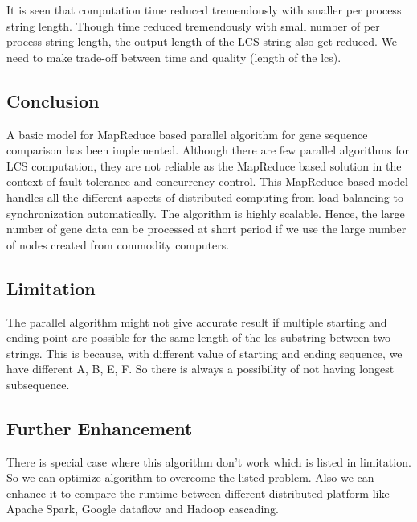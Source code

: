 \documentclass[journal,twoside]{IEEEtran}
\begin{document}
It is seen that computation time reduced tremendously with smaller per process string length. Though time reduced tremendously with small number of per process string length, the output length of the LCS string also get reduced. We need to make trade-off between time and quality (length of the lcs). 


\subsection{Conclusion}
A basic model for MapReduce based parallel algorithm for gene sequence comparison has been implemented. Although there are few parallel algorithms for LCS computation, they are not reliable as the MapReduce based solution in the context of fault tolerance and concurrency control. This MapReduce based model handles all the different aspects of distributed computing from load balancing to synchronization automatically. The algorithm is highly scalable. Hence, the large number of gene data can be processed at short period if we use the large number of nodes created from commodity computers.

\subsection{Limitation}
The parallel algorithm might not give accurate result if multiple starting and ending point are possible for the same length of the lcs substring between two strings. This is because, with different value of starting and ending sequence, we have different A, B, E, F. So there is always a possibility of not having longest subsequence.

\subsection{Further Enhancement}
There is special case where this algorithm don’t work which is listed in limitation. So we can optimize algorithm to overcome the listed problem. Also we can enhance it to compare the runtime between different distributed platform like Apache Spark, Google dataflow and Hadoop cascading.
\end{document}
